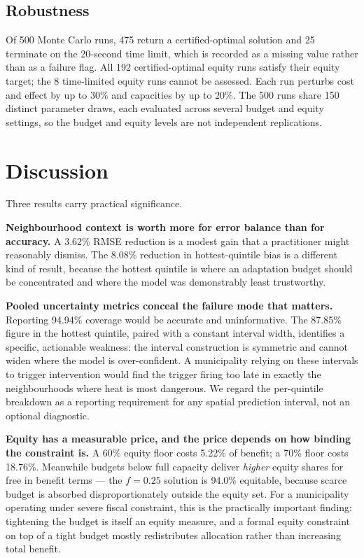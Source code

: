 \subsection{Robustness}\label{g.-robustness}

Of 500 Monte Carlo runs, 475 return a certified-optimal solution and 25 terminate on the 20-second
time limit, which is recorded as a missing value rather than as a failure flag. All 192
certified-optimal equity runs satisfy their equity target; the 8 time-limited equity runs cannot be
assessed. Each run perturbs cost and effect by up to \textpm{}30\% and capacities by up to \textpm{}20\%. The 500 runs
share 150 distinct parameter draws, each evaluated across several budget and equity settings, so the
budget and equity levels are not independent replications.

\section{Discussion}\label{vii.-discussion}

Three results carry practical significance.

\textbf{Neighbourhood context is worth more for error balance than for accuracy.} A 3.62\% RMSE reduction is
a modest gain that a practitioner might reasonably dismiss. The 8.08\% reduction in hottest-quintile
bias is a different kind of result, because the hottest quintile is where an adaptation budget should
be concentrated and where the model was demonstrably least trustworthy.

\textbf{Pooled uncertainty metrics conceal the failure mode that matters.} Reporting 94.94\% coverage would
be accurate and uninformative. The 87.85\% figure in the hottest quintile, paired with a constant
interval width, identifies a specific, actionable weakness: the interval construction is symmetric
and cannot widen where the model is over-confident. A municipality relying on these intervals to
trigger intervention would find the trigger firing too late in exactly the neighbourhoods where
heat is most dangerous. We regard the per-quintile breakdown as a reporting requirement for any
spatial prediction interval, not an optional diagnostic.

\textbf{Equity has a measurable price, and the price depends on how binding the constraint is.} A 60\%
equity floor costs 5.22\% of benefit; a 70\% floor costs 18.76\%. Meanwhile budgets below full capacity
deliver \emph{higher} equity shares for free in benefit terms --- the \(f = 0.25\) solution is 94.0\% equitable,
because scarce budget is absorbed disproportionately outside the equity set. For a municipality
operating under severe fiscal constraint, this is the practically important finding: tightening the
budget is itself an equity measure, and a formal equity constraint on top of a tight budget mostly
redistributes allocation rather than increasing total benefit.

